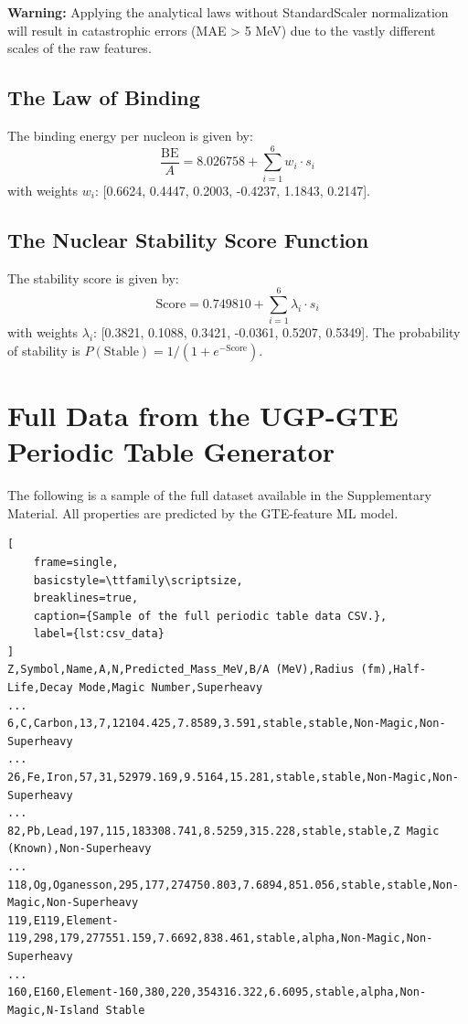 \documentclass[9pt,twocolumn]{extarticle}
\newcommand{\BE}{\text{BE}}
\begin{document}
\textbf{Warning:} Applying the analytical laws without StandardScaler normalization will result in catastrophic errors (MAE > 5 MeV) due to the vastly different scales of the raw features.

\subsection{The Law of Binding}
The binding energy per nucleon is given by:
\begin{equation*}
\frac{\BE}{A} = 8.026758 + \sum_{i=1}^{6} w_i \cdot s_i
\end{equation*}
with weights $w_i$: [0.6624, 0.4447, 0.2003, -0.4237, 1.1843, 0.2147].

\subsection{The Nuclear Stability Score Function}
The stability score is given by:
\begin{equation*}
\text{Score} = 0.749810 + \sum_{i=1}^{6} \lambda_i \cdot s_i
\end{equation*}
with weights $\lambda_i$: [0.3821, 0.1088, 0.3421, -0.0361, 0.5207, 0.5349]. The probability of stability is $P(\text{Stable}) = 1 / (1 + e^{-\text{Score}})$.

\section{Full Data from the UGP-GTE Periodic Table Generator}
The following is a sample of the full dataset available in the Supplementary Material. All properties are predicted by the GTE-feature ML model.

\begin{lstlisting}[
    frame=single,
    basicstyle=\ttfamily\scriptsize,
    breaklines=true,
    caption={Sample of the full periodic table data CSV.},
    label={lst:csv_data}
]
Z,Symbol,Name,A,N,Predicted_Mass_MeV,B/A (MeV),Radius (fm),Half-Life,Decay Mode,Magic Number,Superheavy
...
6,C,Carbon,13,7,12104.425,7.8589,3.591,stable,stable,Non-Magic,Non-Superheavy
...
26,Fe,Iron,57,31,52979.169,9.5164,15.281,stable,stable,Non-Magic,Non-Superheavy
...
82,Pb,Lead,197,115,183308.741,8.5259,315.228,stable,stable,Z Magic (Known),Non-Superheavy
...
118,Og,Oganesson,295,177,274750.803,7.6894,851.056,stable,stable,Non-Magic,Non-Superheavy
119,E119,Element-119,298,179,277551.159,7.6692,838.461,stable,alpha,Non-Magic,Non-Superheavy
...
160,E160,Element-160,380,220,354316.322,6.6095,stable,alpha,Non-Magic,N-Island Stable
\end{lstlisting}
\end{document}
